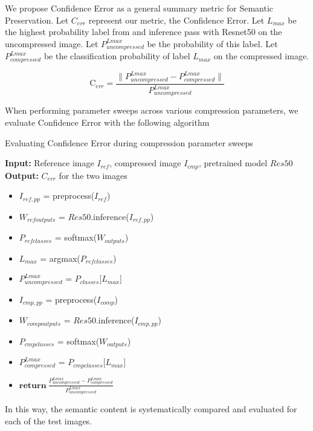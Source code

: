 We propose Confidence Error as a general summary metric for Semantic Preservation. Let $C_{err}$ represent our metric, the Confidence Error. Let $L_{max}$ be the highest probability label from and inference pass with Resnet50 on the uncompressed image. Let $P^{Lmax}_{uncompressed}$ be the probability of this label. Let $P^{Lmax}_{compressed}$ be the classification probability of label $L_{max}$ on the compressed image.

$$
\textrm{C}_{err} = \frac{\|P^{Lmax}_{uncompressed} - P^{Lmax}_{compressed}\|}{P^{Lmax}_{uncompressed}}
$$

When performing parameter sweeps across various compression parameters, we evaluate Confidence Error with the following algorithm
\begin{algorithm}
    \label{alg:Confidence Error Algorithm}
    \caption{Evaluating Confidence Error during compression parameter sweeps}
    \textbf{Input: } Reference image $I_{ref}$, compressed image $I_{cmp}$, pretrained model $Res50$
    \textbf{Output: } $C_{err}$ for the two images
    \begin{itemize}
        \item $I_{ref, pp}$ = preprocess($I_{ref}$)
        \item $W_{ref outputs}$ = $Res50$.inference($I_{ref, pp}$)
        \item $P_{ref classes}$ = softmax($W_{outputs}$)
        \item $L_{max}$ = argmax({$P_{ref classes}$})
        \item $P^{Lmax}_{uncompressed}$ = $P_{classes}$[$L_{max}$]
        \item $I_{cmp, pp}$ = preprocess($I_{comp}$)
        \item $W_{comp outputs}$ = $Res50$.inference($I_{cmp, pp}$)
        \item $P_{cmp classes}$ = softmax($W_{outputs}$)
        \item $P^{Lmax}_{compressed}$ =  $P_{cmp classes}$[$L_{max}$]
        \item $\textbf{return}\ \frac{P^{Lmax}_{uncompressed} - P^{Lmax}_{compressed}}{P^{Lmax}_{uncompressed}}$
        \end{itemize}
    \end{algorithm}


In this way, the semantic content is systematically compared and evaluated for each of the test images.

